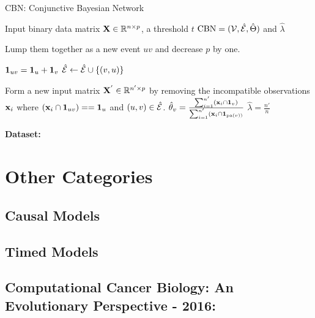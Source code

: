	\begin{algorithm}[t]
		\caption{CBN: Conjunctive Bayesian Network}
		\label{alg3}
		\begin{algorithmic}[1]
			 Input binary data matrix $\mathbf{X} \in \mathbb R^{n \times p}$, a threshold $t$
			 $\text{CBN} = ({\cal V}, \hat{{\cal E}}, \hat{\Theta})$ and $\hat{\lambda}$
			
						\STATE Lump them together as a new event $uv$ and decrease $p$ by one.  
					\ENDIF 
				\ENDFOR 
			\ENDFOR 
						
				\STATE ${\large \bf 1}_{uv} = {\large \bf 1}_{u} + {\large \bf 1}_{v}$ 
					\STATE $\hat{{\cal E}} \leftarrow \hat{{\cal E}} \cup \{(v, u) \}$
				\ENDIF 
				\ENDFOR 
			\ENDFOR	
			
			\STATE Form a new input matrix $\mathbf{X}^{'} \in \mathbb R^{n' \times p}$ by removing the incompatible observations $\mathbf{x}_i$ where $(\mathbf{x}_i \cap {\large \bf 1}_{uv}) == {\large \bf 1}_{u}$ and $(u,v) \in \hat{{\cal E}}$.			
				\STATE $\hat{\theta}_v = \frac{\sum_{i = 1}^{n'} (\mathbf{x}_i \cap {\large \bf 1}_v)}{\sum_{i = 1}^{n'} (\mathbf{x}_i \cap {\large \bf 1}_{\text{pa}(v))}}$
			\ENDFOR 
			\STATE $\hat{\lambda} = \frac{n'}{n}$
		\end{algorithmic}
	\end{algorithm}
	
	{\bf Dataset:}
	

	\section{Other Categories}
	\subsection{Causal Models}
	
	\subsection{Timed Models}	
	
	
	\subsection{Computational Cancer Biology: An Evolutionary Perspective - 2016:}
	
